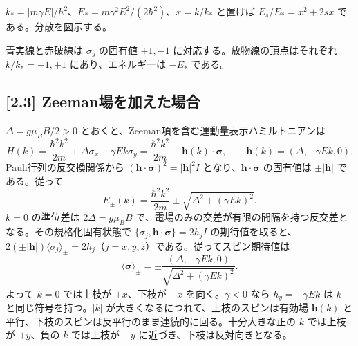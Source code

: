 \documentclass[11pt,a4paper]{article}
\begin{document}
$k_*=|m\gamma E|/\hbar^2$、$E_*=m\gamma^2E^2/(2\hbar^2)$、$x=k/k_*$ と置けば $E_s/E_*=x^2+2sx$ である。分散を図示する。
\begin{center}
\end{center}
青実線と赤破線は $\sigma_y$ の固有値 $+1,-1$ に対応する。放物線の頂点はそれぞれ $k/k_*=-1,+1$ にあり、エネルギーは $-E_*$ である。

\subsection*{[2.3] Zeeman場を加えた場合}
$\Delta=g\mu_BB/2>0$ とおくと、Zeeman項を含む運動量表示ハミルトニアンは
\begin{equation}
 H(k)=\frac{\hbar^2k^2}{2m}+\Delta\sigma_x-\gamma Ek\sigma_y
 =\frac{\hbar^2k^2}{2m}+\boldsymbol h(k)\cdot\boldsymbol\sigma,
 \qquad \boldsymbol h(k)=(\Delta,-\gamma Ek,0).
\end{equation}
Pauli行列の反交換関係から $(\boldsymbol h\cdot\boldsymbol\sigma)^2=|\boldsymbol h|^2I$ となり、$\boldsymbol h\cdot\boldsymbol\sigma$ の固有値は $\pm|\boldsymbol h|$ である。従って
\begin{equation}
 \boxed{E_\pm(k)=\frac{\hbar^2k^2}{2m}
 \pm\sqrt{\Delta^2+(\gamma Ek)^2}}.
\end{equation}
$k=0$ の準位差は $2\Delta=g\mu_BB$ で、電場のみの交差が有限の間隔を持つ反交差となる。その規格化固有状態で $\{\sigma_j,\boldsymbol h\cdot\boldsymbol\sigma\}=2h_jI$ の期待値を取ると、$2(\pm|\boldsymbol h|)\langle\sigma_j\rangle_\pm=2h_j$（$j=x,y,z$）である。従ってスピン期待値は
\begin{equation}
 \boxed{\langle\boldsymbol\sigma\rangle_\pm
 =\pm\frac{(\Delta,-\gamma Ek,0)}{\sqrt{\Delta^2+(\gamma Ek)^2}}.}
\end{equation}
よって $k=0$ では上枝が $+x$、下枝が $-x$ を向く。$\gamma<0$ なら $h_y=-\gamma Ek$ は $k$ と同じ符号を持つ。$|k|$ が大きくなるにつれて、上枝のスピンは有効場 $\boldsymbol h(k)$ と平行、下枝のスピンは反平行のまま連続的に回る。十分大きな正の $k$ では上枝が $+y$、負の $k$ では上枝が $-y$ に近づき、下枝は反対向きとなる。
\end{document}
